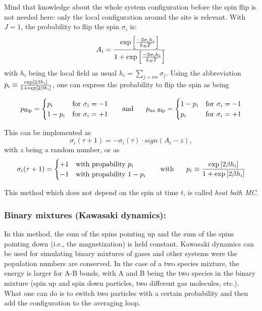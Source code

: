  


 
\noindent 
Mind that knowledge about the whole system configuration before the spin flip is not needed here: only the local configuration around the site is relevant. With $J = 1$, the probability to flip the spin $\sigma_i$ is:
$$
A_i = \frac{\text{exp}\left[\frac{-2 \sigma_i h_i}{k_BT}\right]}{1+\text{exp}\left[\frac{-2 \sigma_i h_i}{k_BT}\right]}
$$
with $h_i$ being the local field as usual $h_i = \sum_{j=nn}{\sigma_j}$. Using the abbreviation $p_i \equiv \frac{\text{exp}\left[2 \beta h_i\right]}{1+\text{exp}\left[2 \beta h_i\right]}$, one can express the probability to flip the spin as being

\begin{equation}
p_{\text{flip}} =\begin{cases}
  p_i  & \text{for }\sigma_i=-1\\
  1-p_i & \text{for }\sigma_i=+1
\end{cases}
\text{\hspace{0.5cm} and  \hspace{0.5cm}}\hfill 
p_{\text{no flip}}   =\begin{cases}
  1- p_i  & \text{for }\sigma_i=-1\\
  p_i & \text{for }\sigma_i=+1
\end{cases}
\end{equation}

\noindent
This can be implemented as  $$\sigma_i(\tau+1)=-\sigma_i(\tau)\cdot sign(A_i-z),$$ with $z$ being a random number, or as
$$
\sigma_i(\tau+1) = \begin{cases}
  +1  & \text{with propability }p_i\\
  -1 & \text{with propability }1- p_i
\end{cases}
\text{\hspace{0.5cm} with  \hspace{0.5cm}}\hfill 
p_i \equiv \frac{\text{exp}\ekl{2 \beta h_i}}{1+\text{exp}\ekl{2 \beta h_i}}
$$

This method which does not depend on the spin at time $t$, is called \emph{heat bath MC}.


 
 
\subsubsection*{Binary mixtures (Kawasaki dynamics):}
In this method, the sum of the spins pointing up and the sum of the spins pointing down (i.e., the magnetization) is held constant. Kawasaki dynamics can be used for simulating  binary mixtures of gases and other systems were the population numbers are conserved. In the case of a two species mixture, the energy is larger for A-B bonds, with A and B being the two species in the binary mixture (spin up and spin down particles, two different gas molecules, etc.). What  one can do is to switch two particles with a certain probability and then add the configuration to the averaging loop. 

